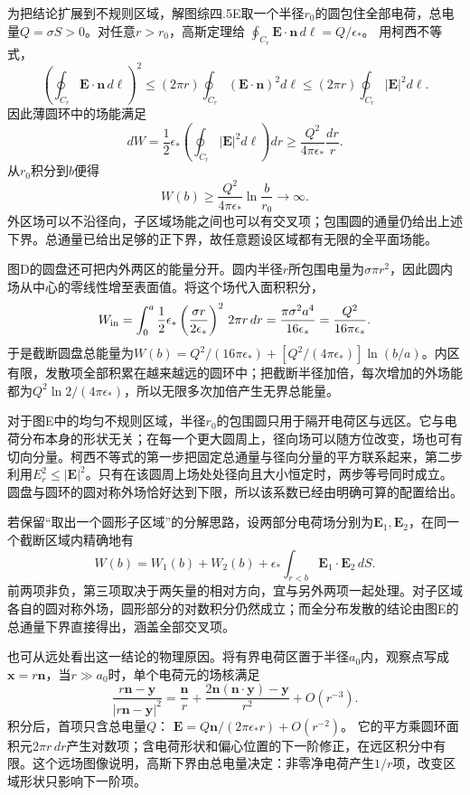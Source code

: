 \documentclass[UTF8,fontset=fandol,a4paper,11pt]{ctexart}
\begin{document}
为把结论扩展到不规则区域，解图综四.5E取一个半径$r_0$的圆包住全部电荷，总电量$Q=\sigma S>0$。对任意$r>r_0$，高斯定理给
$\oint_{C_r}\boldsymbol E\cdot\boldsymbol n\,d\ell=Q/\epsilon_*$。
用柯西不等式，
\[
\left(\oint_{C_r}\boldsymbol E\cdot\boldsymbol n\,d\ell\right)^2
\le(2\pi r)\oint_{C_r}(\boldsymbol E\cdot\boldsymbol n)^2d\ell
\le(2\pi r)\oint_{C_r}|\boldsymbol E|^2d\ell.
\]
因此薄圆环中的场能满足
\[
dW=\frac12\epsilon_*\left(\oint_{C_r}|\boldsymbol E|^2d\ell\right)dr
\ge\frac{Q^2}{4\pi\epsilon_*}\frac{dr}{r}.
\]
从$r_0$积分到$b$便得
\[
\boxed{W(b)\ge
\frac{Q^2}{4\pi\epsilon_*}\ln\frac b{r_0}\longrightarrow\infty}.
\]
外区场可以不沿径向，子区域场能之间也可以有交叉项；包围圆的通量仍给出上述下界。总通量已给出足够的正下界，故任意题设区域都有无限的全平面场能。

图D的圆盘还可把内外两区的能量分开。圆内半径$r$所包围电量为$\sigma\pi r^2$，因此圆内场从中心的零线性增至表面值。将这个场代入面积积分，
\[
W_{\rm in}=\int_0^a\frac12\epsilon_*
\left(\frac{\sigma r}{2\epsilon_*}\right)^2\,2\pi r\,dr
=\frac{\pi\sigma^2a^4}{16\epsilon_*}
=\frac{Q^2}{16\pi\epsilon_*}.
\]
于是截断圆盘总能量为$W(b)=Q^2/(16\pi\epsilon_*)+[Q^2/(4\pi\epsilon_*)]\ln(b/a)$。内区有限，发散项全部积累在越来越远的圆环中；把截断半径加倍，每次增加的外场能都为$Q^2\ln2/(4\pi\epsilon_*)$，所以无限多次加倍产生无界总能量。

对于图E中的均匀不规则区域，半径$r_0$的包围圆只用于隔开电荷区与远区。它与电荷分布本身的形状无关；在每一个更大圆周上，径向场可以随方位改变，场也可有切向分量。柯西不等式的第一步把固定总通量与径向分量的平方联系起来，第二步利用$E_r^2\le|\boldsymbol E|^2$。只有在该圆周上场处处径向且大小恒定时，两步等号同时成立。圆盘与圆环的圆对称外场恰好达到下限，所以该系数已经由明确可算的配置给出。

若保留“取出一个圆形子区域”的分解思路，设两部分电荷场分别为$\boldsymbol E_1,\boldsymbol E_2$，在同一个截断区域内精确地有
\[
W(b)=W_1(b)+W_2(b)+
\epsilon_*\int_{r<b}\boldsymbol E_1\cdot\boldsymbol E_2\,dS.
\]
前两项非负，第三项取决于两矢量的相对方向，宜与另外两项一起处理。对子区域各自的圆对称外场，圆形部分的对数积分仍然成立；而全分布发散的结论由图E的总通量下界直接得出，涵盖全部交叉项。

也可从远处看出这一结论的物理原因。将有界电荷区置于半径$a_0$内，观察点写成$\boldsymbol x=r\boldsymbol n$，当$r\gg a_0$时，单个电荷元的场核满足
\[
\frac{r\boldsymbol n-\boldsymbol y}{|r\boldsymbol n-\boldsymbol y|^2}
=\frac{\boldsymbol n}{r}
+\frac{2\boldsymbol n(\boldsymbol n\cdot\boldsymbol y)-\boldsymbol y}{r^2}
+O(r^{-3}).
\]
积分后，首项只含总电量$Q$：
$\boldsymbol E=Q\boldsymbol n/(2\pi\epsilon_*r)+O(r^{-2})$。
它的平方乘圆环面积元$2\pi r\,dr$产生对数项；含电荷形状和偏心位置的下一阶修正，在远区积分中有限。这个远场图像说明，高斯下界由总电量决定：非零净电荷产生$1/r$项，改变区域形状只影响下一阶项。
\end{document}
